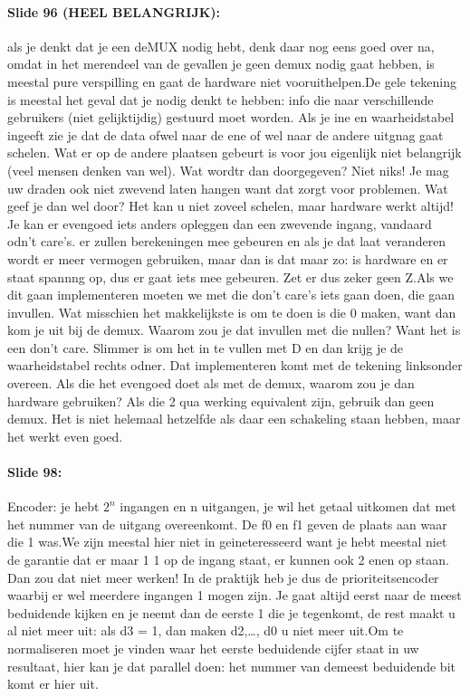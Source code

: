 \documentclass[10pt,a4paper]{book}
\begin{document}
\paragraph{Slide 96 (HEEL BELANGRIJK):} als je denkt dat je een deMUX nodig hebt, denk daar nog eens goed over na, omdat in het merendeel van de gevallen je geen demux nodig gaat hebben, is meestal pure verspilling en gaat de hardware niet vooruithelpen.De gele tekening is meestal het geval dat je nodig denkt te hebben: info die naar verschillende gebruikers (niet gelijktijdig) gestuurd moet worden. Als je ine en waarheidstabel ingeeft zie je dat de data ofwel naar de ene of wel naar de andere uitgnag gaat schelen. Wat er  op de andere plaatsen gebeurt is voor jou eigenlijk niet belangrijk (veel mensen denken van wel). Wat wordtr dan doorgegeven? Niet niks! Je mag uw draden ook niet zwevend laten hangen want dat zorgt voor problemen. Wat geef je dan wel door? Het kan u niet zoveel schelen, maar hardware werkt altijd! Je kan er evengoed iets anders opleggen dan een zwevende ingang, vandaard odn't care's. er zullen berekeningen mee gebeuren en als je dat laat veranderen wordt er meer vermogen gebruiken, maar dan is dat maar zo: is hardware en er staat spannng op, dus er gaat iets mee gebeuren. Zet er dus zeker geen Z.Als we dit gaan implementeren moeten we met die don't care's iets gaan doen, die gaan invullen. Wat misschien het makkelijkste is om te doen is die 0 maken, want dan kom je uit bij de demux. Waarom zou je dat invullen met die nullen? Want het is een don't care. Slimmer is om het in te vullen met D en dan krijg je de waarheidstabel rechts odner. Dat implementeren komt met de tekening linksonder overeen. Als die het evengoed doet als met de demux, waarom zou je dan hardware gebruiken? Als die 2 qua werking equivalent zijn, gebruik dan geen demux. Het is niet helemaal hetzelfde als daar een schakeling staan hebben, maar het werkt even goed.

\paragraph{Slide 98:} Encoder: je hebt $2^n$ ingangen en n uitgangen, je wil het getaal uitkomen dat met het nummer van de uitgang overeenkomt. De f0 en f1 geven de plaats aan waar die 1 was.We zijn meestal hier niet in geineteresseerd want je hebt meestal niet de garantie dat er maar 1 1 op de ingang staat, er kunnen ook 2 enen op staan. Dan zou dat niet meer werken! In de praktijk heb je dus de prioriteitsencoder waarbij er wel meerdere ingangen 1 mogen zijn. Je gaat altijd eerst naar de meest beduidende kijken en je neemt dan de eerste 1 die je tegenkomt, de rest maakt u al niet meer uit: als d3 = 1, dan maken d2,\ldots, d0 u niet meer uit.Om te normaliseren moet je vinden waar het eerste beduidende cijfer staat in uw resultaat, hier kan je dat parallel doen: het nummer van demeest beduidende bit komt er hier uit.
\end{document}
